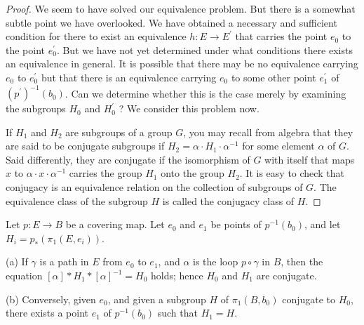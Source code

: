 \begin{proof}
We seem to have solved our equivalence problem. But there is a somewhat subtle point we have overlooked. We have obtained a necessary and sufficient condition for there to exist an equivalence \(h : E \rightarrow {E}^{\prime }\) that carries the point \(e_{0}\) to the point \(e_0^{\prime }\). But we have not yet determined under what conditions there exists an equivalence in general. It is possible that there may be no equivalence carrying \(e_{0}\) to \(e_0^{\prime }\) but that there is an equivalence carrying \(e_{0}\) to some other point \(e_1^{\prime }\) of \({( p^{\prime }) }^{-1}( b_{0})\). Can we determine whether this is the case merely by examining the subgroups \(H_{0}\) and \(H_0^{\prime }\) ? We consider this problem now.

If \(H_{1}\) and \(H_{2}\) are subgroups of a group \(G\), you may recall from algebra that they are said to be conjugate subgroups if \(H_{2} = \alpha \cdot {H}_{1} \cdot {\alpha }^{-1}\) for some element \(\alpha\) of \(G\). Said differently, they are conjugate if the isomorphism of \(G\) with itself that maps \(x\) to \(\alpha \cdot x \cdot {\alpha }^{-1}\) carries the group \(H_{1}\) onto the group \(H_{2}\). It is easy to check that conjugacy is an equivalence relation on the collection of subgroups of \(G\). The equivalence class of the subgroup \(H\) is called the conjugacy class of \(H\).
\end{proof}
\begin{lemma}
\label{lem:\thetheorem}
	Let \(p : E \rightarrow B\) be a covering map. Let \(e_{0}\) and \(e_{1}\) be points of \(p^{-1}( b_{0})\), and let \(H_{i} = p_{ * }( {{\pi }_{1}( {E,e_{i}}) })\).
\end{lemma}

(a) If \(\gamma\) is a path in \(E\) from \(e_{0}\) to \(e_{1}\), and \(\alpha\) is the loop \(p \circ \gamma\) in \(B\), then the equation \([ \alpha ] * H_{1} * {[ \alpha ] }^{-1} = H_{0}\) holds; hence \(H_{0}\) and \(H_{1}\) are conjugate.

(b) Conversely, given \(e_{0}\), and given a subgroup \(H\) of \({\pi }_{1}( {B,b_{0}})\) conjugate to \(H_{0}\), there exists a point \(e_{1}\) of \(p^{-1}( b_{0})\) such that \(H_{1} = H\).

